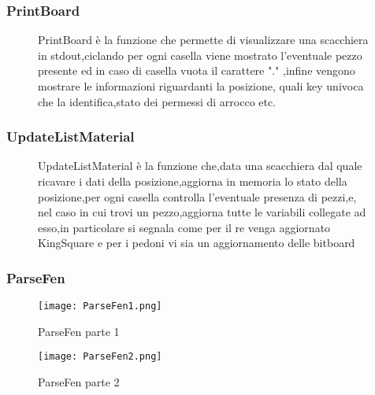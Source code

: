 \subsubsection{PrintBoard}
\begin{figure}[H]
    \begin{minipage}[t]{.63\textwidth}
        \centering {}
    \end{minipage}
    \begin{minipage}[t]{0.35\textwidth}
        \small{PrintBoard è la funzione che permette di visualizzare una scacchiera in stdout,ciclando per ogni casella viene mostrato l'eventuale pezzo presente ed in caso di casella vuota il carattere "." ,infine
            vengono mostrare le informazioni riguardanti la posizione, quali key univoca che la identifica,stato dei permessi di arrocco etc.}
    \end{minipage}
\end{figure}



\subsubsection{UpdateListMaterial}
\begin{figure}[H]
    \begin{minipage}[t]{.63\textwidth}
        \centering {}
    \end{minipage}
    \begin{minipage}[t]{0.35\textwidth}
        \small{UpdateListMaterial è la funzione che,data una scacchiera dal quale ricavare i dati della posizione,aggiorna in memoria lo stato della posizione,per ogni casella controlla l'eventuale presenza di pezzi,e,
            nel caso in cui trovi un pezzo,aggiorna tutte le variabili collegate ad esso,in particolare si segnala come per il re venga aggiornato KingSquare e per i pedoni vi sia un aggiornamento delle bitboard}
    \end{minipage}
\end{figure}


\subsubsection{ParseFen}


\begin{figure}[H]
    \centering
    \begin{minipage}[b]{0.4\textwidth}
        \texttt{[image: ParseFen1.png]}
        \caption{ParseFen parte 1}
    \end{minipage}
    \hfill
    \begin{minipage}[b]{0.4\textwidth}
        \texttt{[image: ParseFen2.png]}
        \caption{ParseFen parte 2}
    \end{minipage}
\end{figure}





